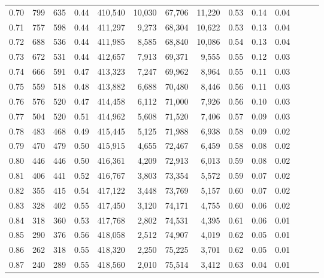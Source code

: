 \begin{tabular}{rrrrrrrrrrrrrr}
0.70 &     799 &    635 &  0.44 &  410,540 &   10,030 &  67,706 &  11,220 &  0.53 &  0.14 &      0.04 \\
0.71 &     757 &    598 &  0.44 &  411,297 &    9,273 &  68,304 &  10,622 &  0.53 &  0.13 &      0.04 \\
0.72 &     688 &    536 &  0.44 &  411,985 &    8,585 &  68,840 &  10,086 &  0.54 &  0.13 &      0.04 \\
0.73 &     672 &    531 &  0.44 &  412,657 &    7,913 &  69,371 &   9,555 &  0.55 &  0.12 &      0.03 \\
0.74 &     666 &    591 &  0.47 &  413,323 &    7,247 &  69,962 &   8,964 &  0.55 &  0.11 &      0.03 \\
0.75 &     559 &    518 &  0.48 &  413,882 &    6,688 &  70,480 &   8,446 &  0.56 &  0.11 &      0.03 \\
0.76 &     576 &    520 &  0.47 &  414,458 &    6,112 &  71,000 &   7,926 &  0.56 &  0.10 &      0.03 \\
0.77 &     504 &    520 &  0.51 &  414,962 &    5,608 &  71,520 &   7,406 &  0.57 &  0.09 &      0.03 \\
0.78 &     483 &    468 &  0.49 &  415,445 &    5,125 &  71,988 &   6,938 &  0.58 &  0.09 &      0.02 \\
0.79 &     470 &    479 &  0.50 &  415,915 &    4,655 &  72,467 &   6,459 &  0.58 &  0.08 &      0.02 \\
0.80 &     446 &    446 &  0.50 &  416,361 &    4,209 &  72,913 &   6,013 &  0.59 &  0.08 &      0.02 \\
0.81 &     406 &    441 &  0.52 &  416,767 &    3,803 &  73,354 &   5,572 &  0.59 &  0.07 &      0.02 \\
0.82 &     355 &    415 &  0.54 &  417,122 &    3,448 &  73,769 &   5,157 &  0.60 &  0.07 &      0.02 \\
0.83 &     328 &    402 &  0.55 &  417,450 &    3,120 &  74,171 &   4,755 &  0.60 &  0.06 &      0.02 \\
0.84 &     318 &    360 &  0.53 &  417,768 &    2,802 &  74,531 &   4,395 &  0.61 &  0.06 &      0.01 \\
0.85 &     290 &    376 &  0.56 &  418,058 &    2,512 &  74,907 &   4,019 &  0.62 &  0.05 &      0.01 \\
0.86 &     262 &    318 &  0.55 &  418,320 &    2,250 &  75,225 &   3,701 &  0.62 &  0.05 &      0.01 \\
0.87 &     240 &    289 &  0.55 &  418,560 &    2,010 &  75,514 &   3,412 &  0.63 &  0.04 &      0.01 \\

\end{tabular}
